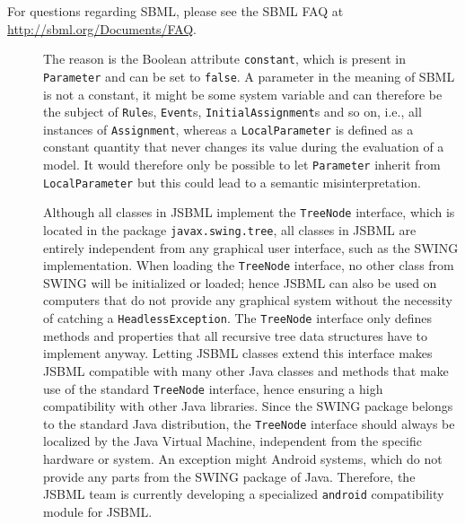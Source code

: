 For questions regarding SBML, please see the SBML FAQ at
\url{http://sbml.org/Documents/FAQ}.
\begin{description}
\item[\parbox{\textwidth}{Why does the class \texttt{LocalParameter} not inherit
from \texttt{Parameter}?}]
The reason is the Boolean
attribute \texttt{constant}, which is present in
\texttt{Parameter} and can be set to \texttt{false}. A parameter in the meaning
of SBML is not a constant, it might be some system variable
and can therefore be the subject of \texttt{Rule}s,
\texttt{Event}s, \texttt{InitialAssignment}s
and so on, i.e., all instances of \texttt{Assignment},
whereas a \texttt{LocalParameter} is defined as a constant quantity that never
changes its value during the evaluation of a model. It would
therefore only be possible to let \texttt{Parameter} inherit from
\texttt{LocalParameter} but this could lead to a semantic misinterpretation.

\item[\parbox{\textwidth}{Does JSBML depend on SWING or any particular graphical
user interface implementation?}]
Although all classes in JSBML implement the \texttt{TreeNode} interface, which
is located in the package \texttt{javax.swing.tree}, all classes in JSBML are
entirely independent from any graphical user interface, such as the
SWING implementation. When
loading the \texttt{TreeNode} interface, no other class from SWING will be
initialized or loaded; hence JSBML can also be used on computers that do not
provide any graphical system without the necessity of catching a
\texttt{HeadlessException}. The \texttt{TreeNode} interface only defines
methods and properties that all recursive tree data structures have to
implement anyway. Letting JSBML classes extend this interface makes JSBML
compatible with many other Java classes and methods that make use of the
standard \texttt{TreeNode} interface, hence ensuring a high compatibility with
other Java libraries. Since the SWING package belongs to the standard
Java\texttrademark{} distribution, the \texttt{TreeNode} interface should
always be localized by the Java Virtual Machine, independent from the specific
hardware or system. An exception might Android systems, which
do not provide any parts from the SWING package of Java. Therefore, the JSBML
team is currently developing a specialized \texttt{android} compatibility
module for JSBML.


\end{description}
